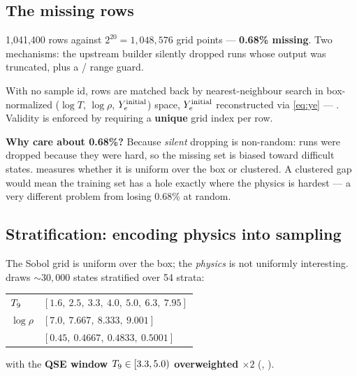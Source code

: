 \subsection{The missing rows}
\label{sec:missingrows}

1,041,400 rows against $2^{20} = 1{,}048{,}576$ grid points ---
\textbf{0.68\% missing}. Two mechanisms: the upstream builder silently dropped
runs whose output was truncated, plus a / range guard.

With no sample id, rows are matched back by nearest-neighbour search in
box-normalized ($\log T$, $\log\rho$, $Y_{e}^{\text{initial}}$) space,
$Y_{e}^{\text{initial}}$ reconstructed via \eqref{eq:ye} ---
. Validity is enforced by requiring
a \textbf{unique} grid index per row.

\textbf{Why care about 0.68\%?} Because \emph{silent} dropping is non-random:
runs were dropped because they were hard, so the missing set is biased toward
difficult states.  measures whether it is
uniform over the box or clustered. A clustered gap would mean the training set
has a hole exactly where the physics is hardest --- a very different problem
from losing 0.68\% at random.

\subsection{Stratification: encoding physics into sampling}
\label{sec:stratification}

The Sobol grid is uniform over the box; the \emph{physics} is not uniformly
interesting.  draws ${\sim}30{,}000$ states stratified
over 54 strata:

\begin{center}
\begin{tabular}{@{}l l@{}}
\toprule
$T_{9}$      & $[1.6,\ 2.5,\ 3.3,\ 4.0,\ 5.0,\ 6.3,\ 7.95]$ \\
$\log\rho$ & $[7.0,\ 7.667,\ 8.333,\ 9.001]$ \\
\Ye{}      & $[0.45,\ 0.4667,\ 0.4833,\ 0.5001]$ \\
\bottomrule
\end{tabular}
\end{center}

with the \textbf{QSE window $T_{9} \in [3.3, 5.0)$ overweighted $\times2$}
(, ).

